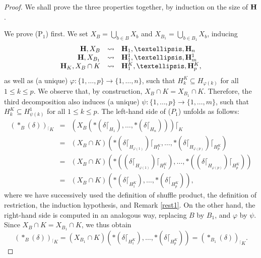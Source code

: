 \documentclass[10pt,a4paper]{amsart}
\newcommand{\Union}{\bigcup}
\newcommand{\hyper}[1]{{\bf #1}}
\newcommand{\inc}{\subseteq}
\newcommand{\inter}{\cap}
\newcommand{\restrconstr}[2]{{#1}_{{}^\lceil {#2}}}
\newcommand{\set}[1]{\{#1\}}
\begin{document}
\begin{proof} We shall prove   the three  properties   together, by induction on the size of ${\bf H}$.  

\smallskip

 We   prove  (P$_1$) first. We set $X_B=\Union_{b\in B}X_b$ and $X_{B_1}=\Union_{b\in B_1}X_b$, inducing
$$\begin{array}{rcl}

\hyper{H},X_B & \leadsto & \hyper{H}_1,\ldots,\hyper{H}_n\\ 
\hyper{H},X_{B_1} & \leadsto & \hyper{H}^1_1,\ldots,\hyper{H}^1_m \\
\hyper{H}_K,X_{B}\inter K & \leadsto &\hyper{H}_1^K,\ldots,\hyper{H}_p^K,
\end{array}$$
as well as (a unique) $\varphi:\set{1,\ldots,p}\rightarrow\set{1,\ldots,n}$, such that $H_k^K\inc H_{\varphi(k)}$ for all $1\leq k\leq p$. We observe that, by construction, $X_B\cap K=X_{B_1}\cap K$. Therefore, the third decomposition also induces (a unique) $\psi:\set{1,\ldots,p}\rightarrow\set{1,\ldots,m}$, such that $H_k^K\inc H^1_{\psi(k)}$ for all $1\leq k\leq p$. The left-hand side of ($P_1$) unfolds as follows:  
 $$\begin{array}{rcl}
\restrconstr{(\ast_B(\delta))}{K} & =&(X_ B(\ast(\delta\lceil_{H_1}),\dots,\ast(\delta\lceil_{H_n})))\lceil_{K} \\[0.1cm]
&=&(X_B\cap K)(\ast(\delta\lceil_{H_{\varphi(1)}})\lceil_{H^K_1}, \dots ,\ast(\delta\lceil_{H_{\varphi(p)}})\lceil_{H^K_p}) \\[0.1cm]
&=& (X_B\cap K) (\ast((\delta\lceil_{H_{\varphi(1)}})\lceil_{H^K_1}), \dots ,\ast((\delta\lceil_{H_{\varphi(p)}})\lceil_{H^K_p})) \\[0.1cm]
&=& (X_B\cap K)(\ast(\delta\lceil_{{H^K_1}}), \dots ,\ast(\delta\lceil_{{H^K_p}})), 
\end{array}$$
where we have successively used the definition of shuffle product, the definition of restriction, the induction hypothesis, and Remark \ref{rest1}. On the other hand, the right-hand side is computed in an analogous way, replacing $B$ by $B_1$, and $\varphi$ by $\psi$. Since $X_B\cap K=X_{B_1}\cap K$, we thus obtain $$\restrconstr{(\ast_B(\delta))}{K} =(X_{B_1}\cap K)(\ast(\delta\lceil_{{H^K_1}}), \dots ,\ast(\delta\lceil_{{H^K_p}}))=\restrconstr{(\ast_{B_1}(\delta))}{K}.$$
 
\smallskip
 

\end{proof}
\end{document}
